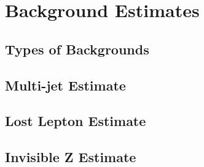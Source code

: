 \chapter{Background Estimates}
\label{ch:bkgs}

\section{Types of Backgrounds}
\label{sec:bkgs}

\section{Multi-jet Estimate}
\label{sec:qcd}

\section{Lost Lepton Estimate}
\label{sec:lostlep}

\section{Invisible Z Estimate}
\label{sec:zinv}
